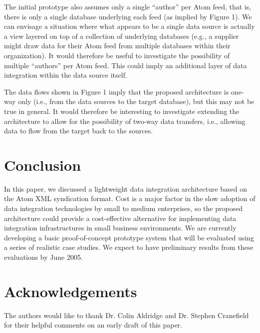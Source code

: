 \documentclass{CRPITStyle}
\begin{document}
The initial prototype also assumes only a single ``author'' per Atom feed,
that is, there is only a single database underlying each feed (as
implied by Figure 1). We can envisage a situation where what appears to
be a single data source is actually a view layered on top of a
collection of underlying databases (e.g., a supplier might draw data for
their Atom feed from multiple databases within their organization). It
would therefore be useful to investigate the possibility of multiple
``authors'' per Atom feed. This could imply an additional layer of data
integration within the data source itself.

The data flows shown in Figure 1 imply that the proposed architecture is
one-way only (i.e., from the data sources to the target database), but
this may not be true in general. It would therefore be interesting to
investigate extending the architecture to allow for the possibility of
two-way data transfers, i.e., allowing data to flow from the target back
to the sources.


\section{Conclusion}
\label{sec-conclusion}

In this paper, we discussed a lightweight data integration architecture
based on the Atom XML syndication format. Cost is a major factor in the
slow adoption of data integration technologies by small to medium
enterprises, so the proposed architecture could provide a cost-effective
alternative for implementing data integration infrastructures in small
business environments. We are currently developing a basic
proof-of-concept prototype system that will be evaluated using a series
of realistic case studies. We expect to have preliminary results from
these evaluations by June 2005.


\section{Acknowledgements}
\label{sec-acknowledgements}

The authors would like to thank Dr. Colin Aldridge and Dr. Stephen
Cranefield for their helpful comments on an early draft of this paper.




\end{document}
